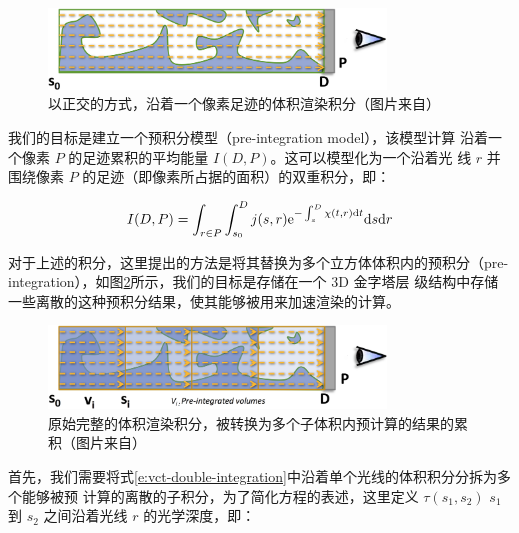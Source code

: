 \begin{figure}
\begin{center}
	\includegraphics[width=0.8\textwidth]{figures/vct/vct-7-1}
	\end{center}
	\caption{以正交的方式，沿着一个像素足迹的体积渲染积分（图片来自\cite{a:InteractiveIndirectIlluminationUsingVoxelConeTracing}）}
	\label{f:vct-7-1}
\end{figure}

我们的目标是建立一个预积分模型（pre-integration model），该模型计算 沿着一个像素 $P$ 的足迹累积的平均能量 $I(D,P)$。这可以模型化为一个沿着光 线 $r$ 并围绕像素 $P$ 的足迹（即像素所占据的面积）的双重积分，即：

\begin{equation}\label{e:vct-double-integration}
	I(D,P)=\int_{r\in P}\int^{D}_{s_0}j(s,r){\rm e}^{-\int^{D}_s\chi (t,r){\rm d}t}{\rm d}s{\rm d}r
\end{equation}

对于上述的积分，这里提出的方法是将其替换为多个立方体体积内的预积分（pre-integration），如图\ref{f:vct-7-2}所示，我们的目标是存储在一个 3D 金字塔层 级结构中存储一些离散的这种预积分结果，使其能够被用来加速渲染的计算。

\begin{figure}
\begin{center}
	\includegraphics[width=0.8\textwidth]{figures/vct/vct-7-2}
	\end{center}
	\caption{原始完整的体积渲染积分，被转换为多个子体积内预计算的结果的累积（图片来自\cite{a:InteractiveIndirectIlluminationUsingVoxelConeTracing}）}
	\label{f:vct-7-2}
\end{figure}

首先，我们需要将式\ref{e:vct-double-integration}中沿着单个光线的体积积分分拆为多个能够被预 计算的离散的子积分，为了简化方程的表述，这里定义 $\tau(s_1,s_2)$ $s_1$ 到 $s_2$ 之间沿着光线 $r$ 的光学深度，即：


